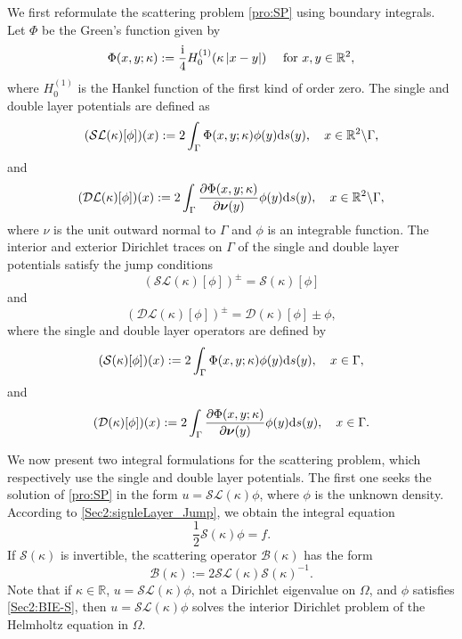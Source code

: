 \documentclass{article}
\renewcommand{\vec}[1]{\boldsymbol{#1}}
\newcommand{\abs}[1]{\left\vert#1\right\vert}
\renewcommand{\vec}[1]{\boldsymbol{#1}}
\begin{document}
	
	We first reformulate the scattering problem \eqref{pro:SP} using boundary integrals. Let $\Phi$ be the Green’s function given by
	\begin{equation*}
		\Phi(x,y;\kappa):=\dfrac{{\rm i}}{4}{ H}^{(1)}_0(\kappa\abs{x-y}) \quad ~\text{for}~x,y\in\mathbb{R}^2,
	\end{equation*}
	where ${H}_0^{(1)}$ is the Hankel function of the first kind of order zero. The single and double layer potentials are defined as
	\begin{equation*}\label{Sec2:singleLayer_P}
		(\mathcal{SL}(\kappa)[\phi])(x):=2\int_{\Gamma}\Phi(x,y;\kappa)\phi(y){\rm d}s(y), \quad x\in\mathbb{R}^2\backslash\Gamma,
	\end{equation*}
	and 
	\begin{equation*}\label{Sec2:doubleLayer_P}
		(\mathcal{DL}(\kappa)[\phi])(x):=2\int_{\Gamma}\dfrac{\partial\Phi(x,y;\kappa)}{\partial \vec{\nu}(y)}\phi(y){\rm d}s(y), \quad x\in\mathbb{R}^2\backslash\Gamma, 
	\end{equation*}
	where $\nu$ is the unit outward normal to $\Gamma$ and $\phi$ is an integrable function. The interior and exterior Dirichlet traces on $\Gamma$ of the single and double layer potentials satisfy the jump conditions
	\begin{equation}\label{Sec2:signleLayer_Jump}
		(\mathcal{SL}(\kappa)[\phi])^{\pm}
		=\mathcal{S}(\kappa)[\phi]
	\end{equation}
	and
	\begin{equation}\label{Sec2:doubleLayer_DJump}
		(\mathcal{DL}(\kappa)[\phi])^{\pm}
		=\mathcal{D}(\kappa)[\phi]\pm\phi,
	\end{equation}
	where the single and double layer operators are defined by
	\begin{equation*}
		(\mathcal{S}(\kappa)[\phi])(x):=2\int_{\Gamma}\Phi(x,y;\kappa)\phi(y){\rm d}s(y), \quad x\in\Gamma,
	\end{equation*}
	and 
	\begin{equation*}
		(\mathcal{D}(\kappa)[\phi])(x):=2\int_{\Gamma}\dfrac{\partial\Phi(x,y;\kappa)}{\partial \vec{\nu}(y)}\phi(y){\rm d}s(y), \quad x\in\Gamma.
	\end{equation*}
	
	
	We now present two integral formulations for the scattering problem, which respectively use the single and double layer potentials. The first one seeks the solution of \eqref{pro:SP} in the form $u=\mathcal{SL}(\kappa)\phi$, where $\phi$ is the unknown density. According to \eqref{Sec2:signleLayer_Jump}, we obtain the integral equation
	\begin{equation}\label{Sec2:BIE-S}
		\dfrac{1}{2}\mathcal{S}(\kappa)\phi=f.
	\end{equation}
	If $\mathcal{S}(\kappa)$ is invertible, the scattering operator $\mathcal{B}(\kappa)$ has the form
	\begin{equation*}
		\mathcal{B}(\kappa):=2\mathcal{SL}(\kappa)\mathcal{S}(\kappa)^{-1}.
	\end{equation*}
	Note that if $\kappa\in\mathbb{R}$, $u=\mathcal{SL}(\kappa)\phi$, not a Dirichlet eigenvalue on $\Omega$, and $\phi$ satisfies \eqref{Sec2:BIE-S}, then $u=\mathcal{SL}(\kappa)\phi$ solves the interior Dirichlet problem of the Helmholtz equation in $\Omega$.
	
\end{document}
